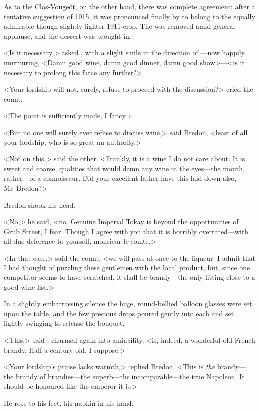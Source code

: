 As to the Clos-Vougeôt, on the other hand, there was complete agreement; after a tentative suggestion of 1915, it was pronounced finally by  to belong to the equally admirable though slightly lighter 1911 crop. The  was removed amid general applause, and the dessert was brought in.

<Is it necessary,> asked , with a slight smile in the direction of —now happily murmuring, <Damn good wine, damn good dinner, damn good show>—<is it necessary to prolong this farce any further?>

<Your lordship will not, surely, refuse to proceed with the discussion?> cried the count.

<The point is sufficiently made, I fancy.>

<But no one will surely ever refuse to discuss wine,> said Bredon, <least of all your lordship, who is so great an authority.>

<Not on this,> said the other. <Frankly, it is a wine I do not care about. It is sweet and coarse, qualities that would damn any wine in the eyes—the mouth, rather—of a connoisseur. Did your excellent father have this laid down also, Mr~Bredon?>

Bredon shook his head.

<No,> he said, <no. Genuine Imperial Tokay is beyond the opportunities of Grub Street, I fear. Though I agree with you that it is horribly overrated—with all due deference to yourself, monsieur le comte.>

<In that case,> said the count, <we will pass at once to the liqueur. I admit that I had thought of puzzling these gentlemen with the local product, but, since one competitor seems to have scratched, it shall be brandy—the only fitting close to a good wine-list.>

In a slightly embarrassing silence the huge, round-bellied balloon glasses were set upon the table, and the few precious drops poured gently into each and set lightly swinging to release the bouquet.

<This,> said , charmed again into amiability, <is, indeed, a wonderful old French brandy. Half a century old, I suppose.>

<Your lordship's praise lacks warmth,> replied Bredon. <This is \emph{the} brandy—the brandy of brandies—the superb—the incomparable—the true Napoleon. It should be honoured like the emperor it is.>

He rose to his feet, his napkin in his hand.

